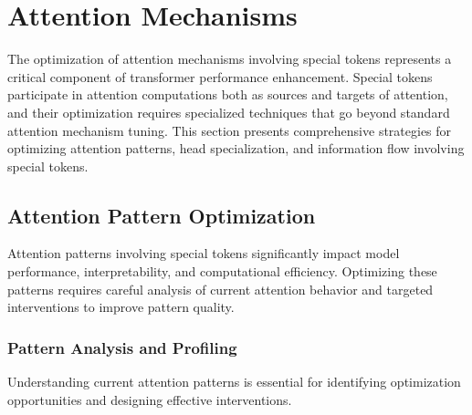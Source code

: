 
\section{Attention Mechanisms}

The optimization of attention mechanisms involving special tokens represents a critical component of transformer performance enhancement. Special tokens participate in attention computations both as sources and targets of attention, and their optimization requires specialized techniques that go beyond standard attention mechanism tuning. This section presents comprehensive strategies for optimizing attention patterns, head specialization, and information flow involving special tokens.

\subsection{Attention Pattern Optimization}

Attention patterns involving special tokens significantly impact model performance, interpretability, and computational efficiency. Optimizing these patterns requires careful analysis of current attention behavior and targeted interventions to improve pattern quality.
\begin{comment}
Feedback: Before linking to the code, it's helpful to explain the core problem. For example: "The goal of attention optimization for special tokens is to ensure they are 'paying attention' to the right things. For instance, a [CLS] token should learn to attend broadly across the entire sequence to create a good summary. If analysis shows it is only attending to the first few tokens, this is a suboptimal pattern. Optimization techniques, such as adding an auxiliary loss that encourages diverse attention, can be used to guide the [CLS] token to learn a more effective pattern."
\end{comment}

\subsubsection{Pattern Analysis and Profiling}

Understanding current attention patterns is essential for identifying optimization opportunities and designing effective interventions.

